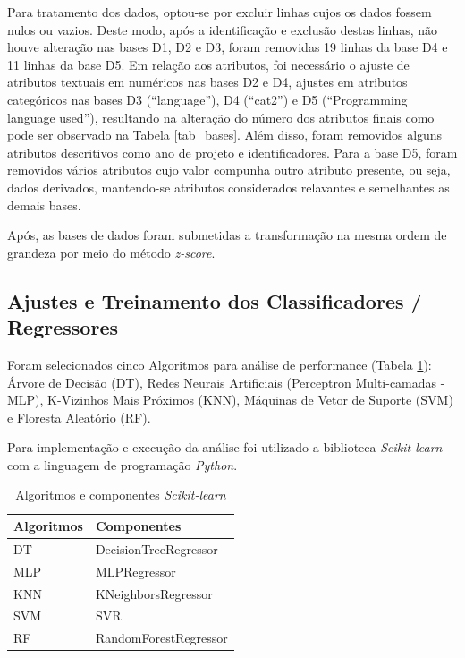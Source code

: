 \documentclass[12pt]{article}
\begin{document}
Para tratamento dos dados, optou-se por excluir linhas cujos os dados fossem nulos ou vazios. Deste modo, após a identificação e exclusão destas linhas, não houve alteração nas bases D1, D2 e D3, foram removidas 19 linhas da base D4 e 11 linhas da base D5. Em relação aos atributos, foi necessário o ajuste de atributos textuais em numéricos nas bases D2 e D4, ajustes em atributos categóricos nas bases D3 (``language''), D4 (``cat2'') e D5 (``Programming language used''), resultando na alteração do número dos atributos finais como pode ser observado na Tabela \ref{tab_bases}. Além disso, foram removidos alguns atributos descritivos como ano de projeto e identificadores. Para a base D5, foram removidos vários atributos cujo valor compunha outro atributo presente, ou seja, dados derivados, mantendo-se atributos considerados relavantes e semelhantes as demais bases.

Após, as bases de dados foram submetidas a transformação na mesma ordem de grandeza por meio do método \textit{z-score}.

\subsection{Ajustes e Treinamento dos Classificadores / Regressores}

Foram selecionados cinco Algoritmos para análise de performance (Tabela \ref{tab_algoritmos}): Árvore de Decisão (DT), Redes Neurais Artificiais (Perceptron Multi-camadas - MLP), K-Vizinhos Mais Próximos (KNN), Máquinas de Vetor de Suporte (SVM) e Floresta Aleatório (RF).

Para implementação e execução da análise foi utilizado a biblioteca \textit{Scikit-learn} \cite{scikitlearn:2011} com a linguagem de programação \textit{Python}.

\begin{table}[h!]
  \begin{center}
    \caption{Algoritmos e componentes \textit{Scikit-learn}}
    \label{tab_algoritmos}
    \begin{tabular}{l|l}
      \textbf{Algoritmos} & \textbf{Componentes}  \\
      \hline
      DT                  & DecisionTreeRegressor \\
      MLP                 & MLPRegressor          \\
      KNN                 & KNeighborsRegressor   \\
      SVM                 & SVR                   \\
      RF                  & RandomForestRegressor \\
    \end{tabular}
  \end{center}
\end{table}
\end{document}
